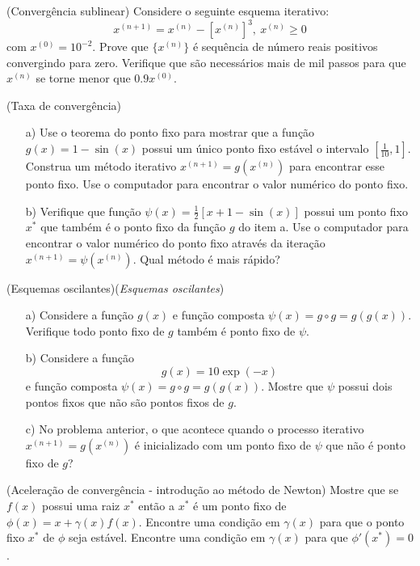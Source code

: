\begin{exer}(Convergência sublinear) Considere o seguinte esquema iterativo:
$$x^{(n+1)}=x^{(n)}-[x^{(n)}]^3,\ x^{(n)}\geq 0$$
com $x^{(0)}= 10^{-2}$.
Prove que $\{x^{(n)}\}$ é sequência de número reais positivos convergindo para zero. Verifique que são necessários mais de mil passos para que $x^{(n)}$ se torne menor que $0.9 x^{(0)}$.
\end{exer}


\begin{exer}(Taxa de convergência)
\begin{itemize}
\item[a)] Use o teorema do ponto fixo para mostrar que a função $g(x)=1-\sin(x)$ possui um único ponto fixo estável o intervalo $[\frac{1}{10},1]$. Construa um método iterativo $x^{(n+1)}=g(x^{(n)})$ para encontrar esse ponto fixo. Use o computador para encontrar o valor numérico do ponto fixo.
\item[b)] Verifique que função $\psi(x)=\frac{1}{2}\left[x+1-\sin(x)\right]$ possui um ponto fixo $x^*$ que também é o ponto fixo da função $g$ do item a. Use o computador para encontrar o valor numérico do ponto fixo através da iteração $x^{(n+1)}=\psi(x^{(n)})$. Qual método é mais rápido?
\end{itemize}
\end{exer}


\begin{exer}(Esquemas oscilantes)(\textit{Esquemas oscilantes})
\begin{itemize}
\item[a)] Considere a função $g(x)$ e função composta $\psi(x)=g\circ g=g\left(g(x)\right)$. Verifique todo ponto fixo de $g$ também é ponto fixo de $\psi$.

\item[b)]  Considere a função $$g(x)=10\exp(-x)$$ e função composta $\psi(x)=g\circ g=g\left(g(x)\right)$. Mostre que $\psi$ possui dois pontos fixos que não são pontos fixos de $g$.

\item[c)]  No problema anterior, o que acontece quando o processo iterativo $x^{(n+1)}=g(x^{(n)})$ é inicializado com um ponto fixo de $\psi$ que não é ponto fixo de $g$?
\end{itemize}
\end{exer}

\begin{exer}(Aceleração de convergência - introdução ao método de Newton)\label{int_new1} Mostre que se $f(x)$ possui uma raiz $x^*$ então a $x^*$ é um ponto fixo de $\phi(x)=x+\gamma(x) f(x)$. Encontre uma condição em $\gamma(x)$ para que o ponto fixo $x^*$ de $\phi$ seja estável. Encontre uma condição em $\gamma(x)$ para que $\phi'(x^*)=0$.
\end{exer}

